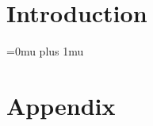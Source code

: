 




\sloppy
{}


\date{\today}
\clearpage

\chapter{Introduction}\label{ch:sample}




\clearpage
\Urlmuskip=0mu plus 1mu\relax
\sloppy

{}

\chapter{Appendix}\label{ch:appendix}



